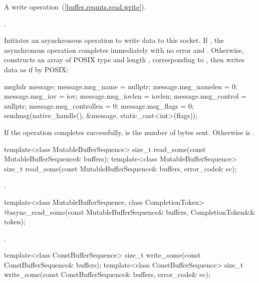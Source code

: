 \begin{itemdescr}
\pnum
A write operation~(\ref{buffer.reqmts.read.write}).

\pnum
\completionsig {}.

\pnum
\effects Initiates an asynchronous operation to write data to this socket. If , the asynchronous operation completes immediately with no error and . Otherwise, constructs an array  of POSIX type  and length , corresponding to , then writes data as if by POSIX:
\begin{codeblock}
msghdr message;
message.msg_name = nullptr;
message.msg_namelen = 0;
message.msg_iov = iov;
message.msg_iovlen = iovlen;
message.msg_control = nullptr;
message.msg_controllen = 0;
message.msg_flags = 0;
sendmsg(native_handle(), &message, static_cast<int>(flags));
\end{codeblock}


\pnum
If the operation completes successfully,  is the number of bytes sent. Otherwise  is .
\end{itemdescr}

\begin{itemdecl}
template<class MutableBufferSequence>
  size_t read_some(const MutableBufferSequence& buffers);
template<class MutableBufferSequence>
  size_t read_some(const MutableBufferSequence& buffers,
                   error_code& ec);
\end{itemdecl}

\begin{itemdescr}
\pnum
\returns {}.
\end{itemdescr}

\begin{itemdecl}
template<class MutableBufferSequence, class CompletionToken>
  @\DEDUCED@ async_read_some(const MutableBufferSequence& buffers,
                          CompletionToken&& token);
\end{itemdecl}

\begin{itemdescr}
\pnum
\returns {}.
\end{itemdescr}

\begin{itemdecl}
template<class ConstBufferSequence>
  size_t write_some(const ConstBufferSequence& buffers);
template<class ConstBufferSequence>
  size_t write_some(const ConstBufferSequence& buffers,
                    error_code& ec);
\end{itemdecl}

